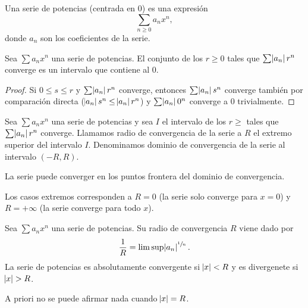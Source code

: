 \begin{defi}
    Una serie de potencias (centrada en 0) es una expresión
    \[
        \sum_{n \geq 0} a_nx^n,
    \]
    donde $a_n$ son los coeficientes de la serie.
\end{defi}

\begin{lema}
    Sea $\sum a_nx^n$ una serie de potencias. El conjunto de los $r \geq 0$ tales
    que $\sum \abs{a_n}r^n$ converge es un intervalo que contiene al 0.
\end{lema}

\begin{proof}
    Si $0 \leq s \leq r$ y $\sum \abs{a_n}r^n$ converge, entonces $\sum \abs{a_n}s^n$
    converge también por comparación directa ($\abs{a_n}s^n \leq \abs{a_n}r^n$) y
    $\sum \abs{a_n}0^n$ converge a 0 trivialmente.
\end{proof}

\begin{defi}
    Sea $\sum a_nx^n$ una serie de potencias y sea $I$ el intervalo de los $r \geq$ tales que
    $\sum \abs{a_n}r^n$ converge. Llamamos radio de convergencia de la serie a $R$ el
    extremo superior del intervalo $I$. Denominamos dominio de convergencia de la serie
    al intervalo $(-R,R)$.
\end{defi}

\begin{obs*}
    La serie puede converger en los puntos frontera del dominio de convergencia.
\end{obs*}

\begin{obs*}
    Los casos extremos corresponden a $R = 0$ (la serie solo converge para $x = 0$)
    y $R = +\infty$ (la serie converge para todo $x$).
\end{obs*}

\begin{teo}
    Sea $\sum a_nx^n$ una serie de potencias. Su radio de convergencia $R$ viene dado por
    \[
        \frac{1}{R} = \limsup \abs{a_n}^{\sfrac{1}{n}}.
    \]
    La serie de potencias es absolutamente convergente si $\abs{x} < R$ y es divergenete
    si $\abs{x} > R$.
\end{teo}

\begin{obs*}
    A priori no se puede afirmar nada cuando $\abs{x} = R$.
\end{obs*}


